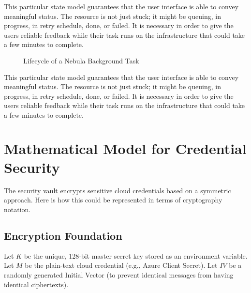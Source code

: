 This particular state model guarantees that the user interface is able to convey meaningful status. The resource is not just stuck; it might be queuing, in progress, in retry schedule, done, or failed. It is necessary in order to give the users reliable feedback while their task runs on the infrastructure that could take a few minutes to complete.
\begin{figure}[h]
\centering
{}
\caption{Lifecycle of a Nebula Background Task}
\label{fig:task_lifecycle_diagram}
\end{figure}
This particular state model guarantees that the user interface is able to convey meaningful status. The resource is not just stuck; it might be queuing, in progress, in retry schedule, done, or failed. It is necessary in order to give the users reliable feedback while their task runs on the infrastructure that could take a few minutes to complete.

\section{Mathematical Model for Credential Security}
The security vault encrypts sensitive cloud credentials based on a symmetric approach. Here is how this could be represented in terms of cryptography notation.


\subsection{Encryption Foundation}
Let $K$ be the unique, 128-bit master secret key stored as an environment variable.
Let $M$ be the plain-text cloud credential (e.g., Azure Client Secret).
Let $IV$ be a randomly generated Initial Vector (to prevent identical messages from having identical ciphertexts).

